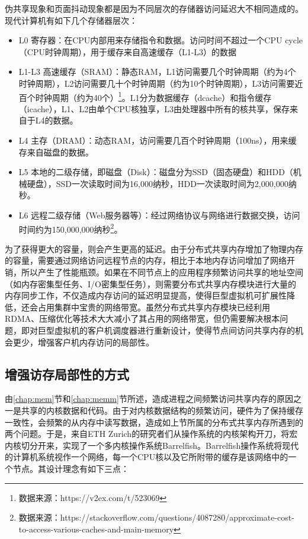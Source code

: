 \label{chap:STOR}
伪共享现象和页面抖动现象都是因为不同层次的存储器访问延迟大不相同造成的。现代计算机有如下几个存储器层次\cite{csapp}：
\begin{itemize}
  \item L0 寄存器：在CPU内部用来存储指令和数据。访问时间不超过一个CPU cycle（CPU时钟周期），用于缓存来自高速缓存（L1-L3）的数据
  \item L1-L3 高速缓存（SRAM）：静态RAM，L1访问需要几个时钟周期（约为4个时钟周期），L2访问需要几十个时钟周期（约为10个时钟周期），L3访问需要近百个时钟周期（约为40个）\footnote{数据来源：https://v2ex.com/t/523069}。L1分为数据缓存（dcache）和指令缓存（icache），L1、L2由单个CPU核独享，L3由处理器中所有的核共享，保存来自于L4的数据。
  \item L4 主存（DRAM）：动态RAM，访问需要几百个时钟周期（100ns），用来缓存来自磁盘的数据。
  \item L5 本地的二级存储，即磁盘（Disk）：磁盘分为SSD（固态硬盘）和HDD（机械硬盘），SSD一次读取时间为16,000纳秒，HDD一次读取时间为2,000,000纳秒。
  \item L6 远程二级存储（Web服务器等）：经过网络协议与网络进行数据交换，访问时间约为150,000,000纳秒\footnote{数据来源：https://stackoverflow.com/questions/4087280/approximate-cost-to-access-various-caches-and-main-memory}。
\end{itemize}

为了获得更大的容量，则会产生更高的延迟。由于分布式共享内存增加了物理内存的容量，需要通过网络访问远程节点的内存，相比于本地内存访问增加了网络开销，所以产生了性能瓶颈。如果在不同节点上的应用程序频繁访问共享的地址空间（如内存密集型任务、I/O密集型任务），则需要分布式共享内存模块进行大量的内存同步工作，不仅造成内存访问的延迟明显提高，使得巨型虚拟机可扩展性降低，还会占用集群中宝贵的网络带宽。虽然分布式共享内存模块已经利用RDMA、压缩优化等技术大大减小了其占用的网络带宽，但仍需要解决根本问题，即对巨型虚拟机的客户机调度器进行重新设计，使得节点间访问共享内存的机会更少，增强客户机内存访问的局部性。
\subsection{增强访存局部性的方式}
由\ref{chap:mem}节和\ref{chap:memm}节所述，造成进程之间频繁访问共享内存的原因之一是共享的内核数据和代码。由于对内核数据结构的频繁访问，硬件为了保持缓存一致性，会频繁的从内存中读写数据，造成如上节所属的分布式共享内存所遇到的两个问题。于是，来自ETH Zurich的研究者们从操作系统的内核架构开刀，将宏内核切分开来，实现了一个多内核操作系统Barrelfish\cite{barrelfish}。Barrelfish操作系统将现代的计算机系统视作一个网络，每一个CPU核以及它所附带的缓存是该网络中的一个节点。其设计理念有如下三点：

